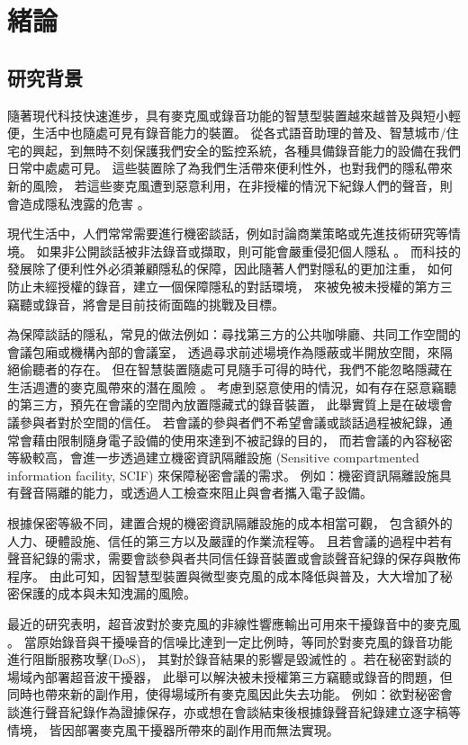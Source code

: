 \chapter{緒論}\label{chapter:intro}

\section{研究背景}\label{section:intro-background}

    隨著現代科技快速進步，具有麥克風或錄音功能的智慧型裝置越來越普及與短小輕便，生活中也隨處可見有錄音能力的裝置。
從各式語音助理的普及、智慧城市/住宅的興起，到無時不刻保護我們安全的監控系統，各種具備錄音能力的設備在我們日常中處處可見。
這些裝置除了為我們生活帶來便利性外，也對我們的隱私帶來新的風險，
若這些麥克風遭到惡意利用，在非授權的情況下紀錄人們的聲音，則會造成隱私洩露的危害 \cite{song2017poster}。

    現代生活中，人們常常需要進行機密談話，例如討論商業策略或先進技術研究等情境。
如果非公開談話被非法錄音或擷取，則可能會嚴重侵犯個人隱私 \cite{chung2017alexa}。
而科技的發展除了便利性外必須兼顧隱私的保障，因此隨著人們對隱私的更加注重，
如何防止未經授權的錄音，建立一個保障隱私的對話環境，
來被免被未授權的第方三竊聽或錄音，將會是目前技術面臨的挑戰及目標。

    為保障談話的隱私，常見的做法例如：尋找第三方的公共咖啡廳、共同工作空間的會議包廂或機構內部的會議室，
透過尋求前述場境作為隱蔽或半開放空間，來隔絕偷聽者的存在。
但在智慧裝置隨處可見隨手可得的時代，我們不能忽略隱藏在生活週遭的麥克風帶來的潛在風險 \cite{mao2020watchdog}。
考慮到惡意使用的情況，如有存在惡意竊聽的第三方，預先在會議的空間內放置隱藏式的錄音裝置，
此舉實質上是在破壞會議參與者對於空間的信任。
若會議的參與者們不希望會議或談話過程被紀錄，通常會藉由限制隨身電子設備的使用來達到不被記錄的目的，
而若會議的內容秘密等級較高，會進一步透過建立機密資訊隔離設施
(Sensitive compartmented information facility, SCIF) 來保障秘密會議的需求。
例如：機密資訊隔離設施具有聲音隔離的能力，或透過人工檢查來阻止與會者攜入電子設備。

    根據保密等級不同，建置合規的機密資訊隔離設施的成本相當可觀，
包含額外的人力、硬體設施、信任的第三方以及嚴謹的作業流程等。
且若會議的過程中若有聲音紀錄的需求，需要會談參與者共同信任錄音裝置或會談聲音紀錄的保存與散佈程序。
由此可知，因智慧型裝置與微型麥克風的成本降低與普及，大大增加了秘密保護的成本與未知洩漏的風險。

    最近的研究表明，超音波對於麥克風的非線性響應輸出可用來干擾錄音中的麥克風 \cite{chen2019understanding}。
當原始錄音與干擾噪音的信噪比達到一定比例時，等同於對麥克風的錄音功能進行阻斷服務攻擊(DoS)，
其對於錄音結果的影響是毀滅性的 \cite{zhang2017dolphinattack}。若在秘密對談的場域內部署超音波干擾器，
此舉可以解決被未授權第三方竊聽或錄音的問題，但同時也帶來新的副作用，使得場域所有麥克風因此失去功能。
例如：欲對秘密會談進行聲音紀錄作為證據保存，亦或想在會談結束後根據錄聲音紀錄建立逐字稿等情境，
皆因部署麥克風干擾器所帶來的副作用而無法實現。

